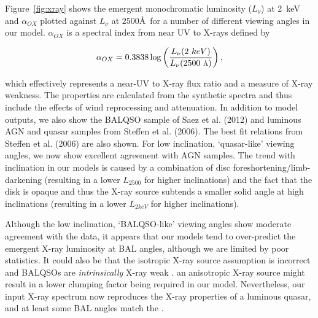 \documentclass[preprint, a4paper, 11pt]{aastex}
\begin{document}



Figure~\ref{fig:xray} shows the emergent
monochromatic luminosity ($L_\nu$) at 2~keV and $\alpha_{OX}$ plotted against 
$L_\nu$ at $2500$\AA\ for a number of different viewing angles in our model.
$\alpha_{OX}$ is a spectral index from near UV to X-rays defined by

\begin{equation}
\alpha_{OX}=0.3838\log\left(\frac{L_{\nu}(2~keV)}{L_{\nu}(2500~\mbox{\scriptsize{\AA}})}\right),
\end{equation}

which effectively represents a near-UV to X-ray flux ratio and a measure of X-ray 
weakness. The properties are calculated from the synthetic spectra and thus include
the effects of wind reprocessing and attenuation. In addition to model outputs,
we also show the BALQSO sample of Saez et al. (2012) and luminous AGN and quasar
samples from Steffen et al. (2006). The best fit relations from Steffen et al. (2006)
are also shown.
For low inclination, `quasar-like' viewing angles,
we now show excellent agreement with AGN samples. The trend with inclination
in our models is caused by a combination of disc foreshortening/limb-darkening 
(resulting in a lower $L_{2500}$ for higher inclinations) and the fact that the disk 
is opaque and thus the X-ray source subtends a smaller solid angle at high inclinations
(resulting in a lower $L_{2keV}$ for higher inclinations). 

Although the low inclination, `BALQSO-like' viewing angles show moderate agreement with the data,
it appears that our models tend to over-predict the emergent X-ray luminosity at BAL angles, 
although we are limited by poor statistics. 
It could also be that the isotropic X-ray source assumption 
is incorrect and BALQSOs are {\em intrinsically} 
X-ray weak \citep[e.g.][]{morabito2013}. 
an anisotropic X-ray source might result in a lower clumping factor being
required in our model.
Nevertheless, our input X-ray spectrum
now reproduces the X-ray properties of a luminous quasar,
and at least some BAL angles match the .
\end{document}
